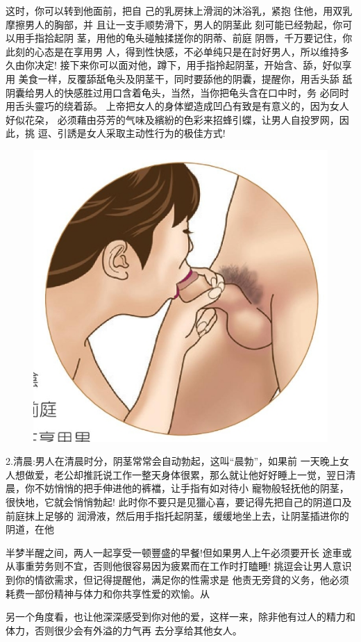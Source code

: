 \documentclass[12pt,UTF8]{ctexbook}
\begin{document}
这时，你可以转到他面前，把自
己的乳房抹上滑润的沐浴乳，紧抱
住他，用双乳摩擦男人的胸部，并
且让一支手顺势滑下，男人的阴茎此
刻可能已经勃起，你可以用手指拾起阴
茎，用他的龟头碰触揉搓你的阴蒂、前庭
阴唇，千万要记住，你此刻的心态是在享用男
人，得到性快感，不必单纯只是在討好男人，所以维持多久由你决定!
接下来你可以面对他，蹲下，用手指拎起阴茎，开始含、舔，好似享用
美食一样，反覆舔舐龟头及阴茎干，同时要舔他的阴囊，提醒你，用舌头舔
舐阴囊给男人的快感胜过用口含着龟头，当然，当你把龟头含在口中时，务
必同时用舌头靈巧的绕着舔。
上帝把女人的身体塑造成凹凸有致是有意义的，因为女人好似花朶，
必须藉由芬芳的气味及繽紛的色彩来招蜂引蝶，让男人自投罗网，因此，挑
逗、引誘是女人采取主动性行为的极佳方式!

\begin{figure}[htbp]
	\centering
	\includegraphics[width=0.7\linewidth]{15}
	\caption{}
	\label{fig:1}
\end{figure}

2.清晨:男人在清晨时分，阴茎常常会自动勃起，这叫“晨勃”，如果前
一天晚上女人想做爱，老公却推託说工作一整天身体很累，那么就让他好好睡上一觉，翌日清晨，你不妨悄悄的把手伸进他的裤襠，让手指有如对待小
寵物般轻抚他的阴茎，很快地，它就会悄悄勃起!
此时你不要只是见獵心喜，要记得先把自己的阴道口及前庭抹上足够的
润滑液，然后用手指托起阴茎，缓缓地坐上去，让阴茎插进你的阴道，在他

半梦半醒之间，两人一起享受一顿豐盛的早餐!但如果男人上午必须要开长
途車或从事重劳务则不宜，否则他很容易因为疲累而在工作时打瞌睡!
挑逗会让男人意识到你的情欲需求，但记得提醒他，满足你的性需求是
他责无旁貸的义务，他必须耗费一部份精神与体力和你共享性爱的欢愉。从

另一个角度看，也让他深深感受到你对他的爱，这样一来，除非他有过人的精力和体力，否则很少会有外溢的力气再
去分享给其他女人。
\end{document}

